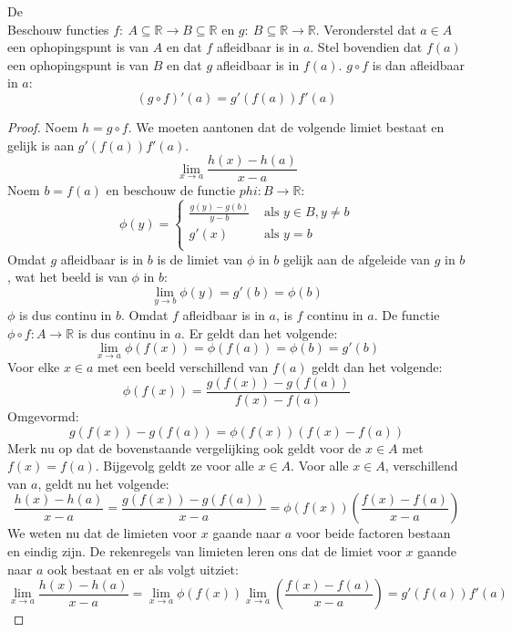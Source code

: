 \documentclass[main.tex]{subfiles}
\begin{document}
\begin{st}
  \label{st:kettingregel}
  De \\
  Beschouw functies $f:\ A \subseteq \mathbb{R} \rightarrow B \subseteq \mathbb{R}$ en $g:\ B \subseteq \mathbb{R} \rightarrow \mathbb{R}$.
  Veronderstel dat $a\in A$ een ophopingspunt is van $A$ en dat $f$ afleidbaar is in $a$.
  Stel bovendien dat $f(a)$ een ophopingspunt is van $B$ en dat $g$ afleidbaar is in $f(a)$.
  $g\circ f$ is dan afleidbaar in $a$:
  \[ (g \circ f)'(a) = g'(f(a))f'(a) \]

  \begin{proof}
    Noem $h=g\circ f$.
    We moeten aantonen dat de volgende limiet bestaat en gelijk is aan $g'(f(a))f'(a)$.
    \[ \lim_{x\rightarrow a}\frac{h(x)-h(a)}{x-a} \]
    Noem $b=f(a)$ en beschouw de functie $phi: B \rightarrow \mathbb{R}$:
    \[
    \phi(y) =
    \left\{
      \begin{array}{cl}
        \frac{g(y)-g(b)}{y-b} & \text{ als } y\in B, y \neq b\\
        g'(x) &\text{ als } y=b\\
      \end{array}
    \right.
    \]
    Omdat $g$ afleidbaar is in $b$ is de limiet van $\phi$ in $b$ gelijk aan de afgeleide van $g$ in $b$, wat het beeld is van $\phi$ in $b$:
    \[ \lim_{y\rightarrow b}\phi(y) = g'(b) = \phi(b) \]
    $\phi$ is dus continu in $b$.
    Omdat $f$ afleidbaar is in $a$, is $f$ continu in $a$.
    De functie $\phi \circ f: A \rightarrow \mathbb{R}$ is dus continu in $a$.
    Er geldt dan het volgende:
    \[ \lim_{x\rightarrow a}\phi(f(x)) = \phi(f(a)) = \phi(b) = g'(b) \]
    Voor elke $x\in a$ met een beeld verschillend van $f(a)$ geldt dan het volgende:
    \[ \phi(f(x)) = \frac{g(f(x)) - g(f(a))}{f(x)-f(a)} \]
    Omgevormd:
    \[ g(f(x)) - g(f(a)) = \phi(f(x))(f(x)-f(a)) \]
    Merk nu op dat de bovenstaande vergelijking ook geldt voor de $x\in A$ met $f(x)=f(a)$.
    Bijgevolg geldt ze voor alle $x\in A$.
    Voor alle $x\in A$, verschillend van $a$, geldt nu het volgende:
    \[ 
    \frac{h(x)-h(a)}{x-a} = \frac{g(f(x))-g(f(a))}{x-a}  = \phi(f(x))\left(\frac{f(x)-f(a)}{x-a}\right)
    \]
    We weten nu dat de limieten voor $x$ gaande naar $a$ voor beide factoren bestaan en eindig zijn.\waarom
    De rekenregels van limieten leren ons dat de limiet voor $x$ gaande naar $a$ ook bestaat en er als volgt uitziet:
    \[ \lim_{x\rightarrow a}\frac{h(x)-h(a)}{x-a} = \lim_{x\rightarrow a}\phi(f(x))\lim_{x\rightarrow a}\left(\frac{f(x)-f(a)}{x-a}\right) = g'(f(a))f'(a) \]
  \end{proof}
\end{st}
\end{document}
